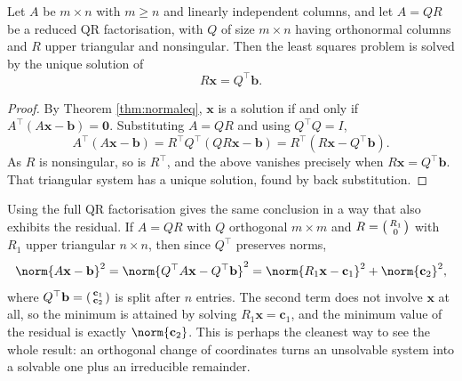 \documentclass[a4paper]{scrartcl}
\begin{document}
\begin{theorem}\label{thm:lsqr}
  Let $A$ be $m\times n$ with $m \geq n$ and linearly independent columns, and let $A = QR$ be a reduced QR factorisation, with $Q$ of size $m\times n$ having orthonormal columns and $R$ upper triangular and nonsingular. Then the least squares problem is solved by the unique solution of
  $$
  R\mathbf x = Q^\top\mathbf b .
  $$
\end{theorem}
\begin{proof}
  By Theorem \ref{thm:normaleq}, $\mathbf x$ is a solution if and only if $A^\top(A\mathbf x - \mathbf b) = \mathbf 0$. Substituting $A = QR$ and using $Q^\top Q = I$,
  $$
  A^\top(A\mathbf x - \mathbf b) = R^\top Q^\top(QR\mathbf x - \mathbf b) = R^\top\left(R\mathbf x - Q^\top\mathbf b\right).
  $$
  As $R$ is nonsingular, so is $R^\top$, and the above vanishes precisely when $R\mathbf x = Q^\top\mathbf b$. That triangular system has a unique solution, found by back substitution.
\end{proof}

\begin{remark}
  Using the full QR factorisation gives the same conclusion in a way that also exhibits the residual. If $A = QR$ with $Q$ orthogonal $m\times m$ and $R = \begin{psmallmatrix}R_1\\0\end{psmallmatrix}$ with $R_1$ upper triangular $n\times n$, then since $Q^\top$ preserves norms,
  $$
  \norm{A\mathbf x - \mathbf b}^2 = \norm{Q^\top A\mathbf x - Q^\top\mathbf b}^2 = \norm{R_1\mathbf x - \mathbf c_1}^2 + \norm{\mathbf c_2}^2,
  $$
  where $Q^\top\mathbf b = \begin{psmallmatrix}\mathbf c_1\\ \mathbf c_2\end{psmallmatrix}$ is split after $n$ entries. The second term does not involve $\mathbf x$ at all, so the minimum is attained by solving $R_1\mathbf x = \mathbf c_1$, and the minimum value of the residual is exactly $\norm{\mathbf c_2}$. This is perhaps the cleanest way to see the whole result: an orthogonal change of coordinates turns an unsolvable system into a solvable one plus an irreducible remainder.
\end{remark}
\end{document}
